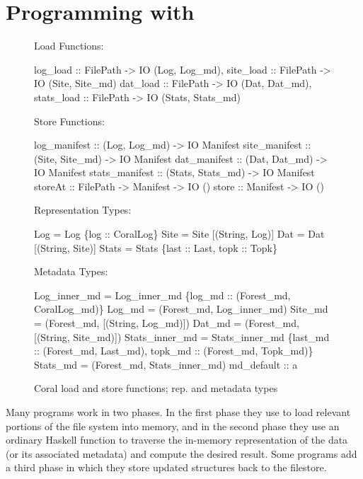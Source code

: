 \section{Programming with \forest{}}
\label{sec:exp}

\begin{figure}
Load Functions:
\begin{code}
log_load   :: FilePath -> IO (Log, Log_md),
site_load  :: FilePath -> IO (Site, Site_md)
dat_load   :: FilePath -> IO (Dat, Dat_md),
stats_load :: FilePath -> IO (Stats, Stats_md)
\end{code}
Store Functions:
\begin{code}
log_manifest   :: (Log, Log_md)     -> IO Manifest
site_manifest  :: (Site, Site_md)   -> IO Manifest
dat_manifest   :: (Dat, Dat_md)     -> IO Manifest
stats_manifest :: (Stats, Stats_md) -> IO Manifest
\mbox{}
storeAt        :: FilePath -> Manifest -> IO ()
store          ::             Manifest -> IO ()
\end{code}
%
Representation Types:
\begin{code}
    Log   = Log   \{log :: CoralLog\}
 Site  = Site  [(String, Log)]
 Dat   = Dat   [(String, Site)]
 Stats = Stats \{last :: Last, topk :: Topk\}
\end{code}
%
Metadata Types:
\begin{code}
 Log_inner_md = Log_inner_md 
    \{log_md :: (Forest_md, CoralLog_md)\}
 Log_md   = (Forest_md, Log_inner_md)
 Site_md  = (Forest_md, [(String, Log_md)])
 Dat_md   = (Forest_md, [(String, Site_md)])
 Stats_inner_md = Stats_inner_md 
    \{last_md :: (Forest_md, Last_md),
     topk_md :: (Forest_md, Topk_md)\}
 Stats_md = (Forest_md, Stats_inner_md)
\mbox{}
md_default :: a
\end{code}
\caption{Coral load and store functions; rep. and metadata types}
\label{fig:coral-aux}
\end{figure}

Many \forest{} programs work in two phases. In the first phase they
use \forest{} to load relevant portions of the file system into memory,
and in the second phase they use an ordinary Haskell function to
traverse the in-memory representation of the data (or its associated
metadata) and compute the desired result.  Some \forest{} programs
add a third phase in which they store updated structures back to the
filestore.


